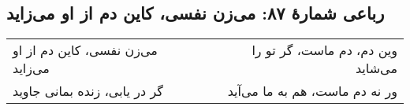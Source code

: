 \begin{center}
\section*{رباعی شمارهٔ ۸۷: می‌زن نفسی، کاین دم از او می‌زاید}
\label{sec:087}
\begin{longtable}{l p{0.5cm} r}
می‌زن نفسی، کاین دم از او می‌زاید
&&
وین دم، دم ماست، گر تو را می‌شاید
\\
گر در یابی، زنده بمانی جاوید
&&
ور نه دم ماست، هم به ما می‌آید
\\
\end{longtable}
\end{center}

